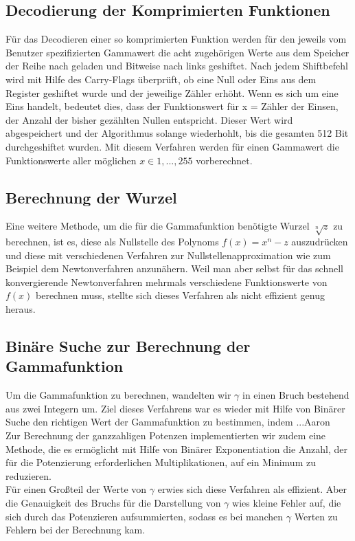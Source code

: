 \documentclass[course=erap]{aspdoc}
\begin{document}
	\subsection{Decodierung der Komprimierten Funktionen}
	Für das Decodieren einer so komprimierten Funktion werden für den jeweils vom Benutzer spezifizierten Gammawert die acht zugehörigen Werte aus dem Speicher der Reihe nach geladen und Bitweise nach links geshiftet. Nach jedem Shiftbefehl wird mit Hilfe des Carry-Flags überprüft, ob eine Null oder Eins aus dem Register geshiftet wurde und der jeweilige Zähler erhöht. Wenn es sich um eine Eins handelt, bedeutet dies, dass der Funktionswert für x = Zähler der Einsen, der Anzahl der bisher gezählten Nullen entspricht. Dieser Wert wird abgespeichert und der Algorithmus solange wiederhohlt, bis die gesamten 512 Bit durchgeshiftet wurden. Mit diesem Verfahren werden für einen Gammawert die Funktionswerte aller möglichen $x\in{1,...,255}$ vorberechnet.

	\subsection{Berechnung der Wurzel}
	Eine weitere Methode, um die für die Gammafunktion benötigte Wurzel $\sqrt[n]{z}$ zu berechnen, ist es, diese als Nullstelle des Polynoms $f(x)=x^n-z$ auszudrücken und diese mit verschiedenen Verfahren zur Nullstellenapproximation wie zum Beispiel dem Newtonverfahren anzunähern. Weil man aber selbst für das schnell konvergierende Newtonverfahren mehrmals verschiedene Funktionswerte von $f(x)$ berechnen muss, stellte sich dieses Verfahren als nicht effizient genug heraus.     
	
	\subsection{Binäre Suche zur Berechnung der Gammafunktion}
	Um die Gammafunktion zu berechnen, wandelten wir  $\gamma$ in einen Bruch bestehend aus zwei Integern um. Ziel dieses Verfahrens war es wieder mit Hilfe von Binärer Suche den richtigen Wert der Gammafunktion zu bestimmen, indem ...Aaron
	\\
	\newline
	\noindent	
	Zur Berechnung der ganzzahligen Potenzen implementierten wir zudem eine Methode, die es ermöglicht mit Hilfe von Binärer Exponentiation die Anzahl, der für die Potenzierung erforderlichen Multiplikationen, auf ein Minimum zu reduzieren. 
	\\
	\newline
	\noindent		 
	Für einen Großteil der Werte von $\gamma$ erwies sich diese Verfahren als effizient. Aber die Genauigkeit des Bruchs für die Darstellung von $\gamma$ wies kleine Fehler auf, die sich durch das Potenzieren aufsummierten, sodass es bei manchen $\gamma$ Werten zu Fehlern bei der Berechnung kam.       
	
\end{document}
